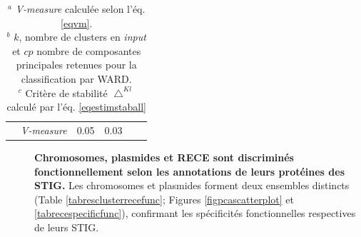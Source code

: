 \begin{table}[H]
\begin{center}
\begin{tabular}{l|c|cccc}
		& \textit{V-measure} & 0.05 & 0.03  \\	
	\end{tabular}
	\medskip
	\captionsetup{justification=justified}
	\caption*{$^{a}$ \textit{V-measure} calculée selon l'éq. \ref{eqvm}. \\ $^{b}$ $k$, nombre de clusters en \textit{input} et $cp$ nombre de composantes principales retenues pour la classification par WARD. \\$^{c}$ Critère de stabilité $\bigtriangleup^{Kl}$ calculé par l'éq. \ref{eqestimstaball}}
	\captionsetup{}	
	\end{center}
\end{table}
		

\begin{description}
\item[\textbullet] \textbf{Chromosomes, plasmides et RECE sont discriminés fonctionnellement selon les annotations de leurs protéines des STIG.} Les chromosomes et plasmides forment deux ensembles distincts (Table \ref{tabresclusterrecefunc}; Figures \ref{figpcascatterplot} et \ref{tabrecespecificfunc}), confirmant les spécificités fonctionnelles respectives de leurs STIG. 
\end{description}
\iffalse
